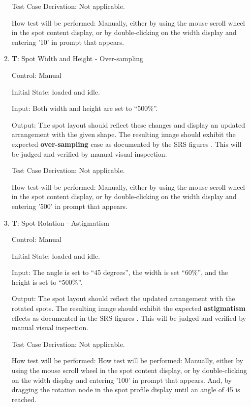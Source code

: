 \documentclass[12pt, titlepage]{article}
\newcounter{testnum} %
\begin{document}
\begin{enumerate}
    Test Case Derivation: Not applicable.
              
    How test will be performed: Manually, either by using the mouse scroll wheel in
      the spot content display, or by double-clicking on the width display and entering '10'
      in prompt that appears.

    \item{\textbf{T\thetestnum \label{T_spotSize500}}: Spot Width and Height - Over-sampling\\}

    Control: Manual
              
    Initial State: \progname{} loaded and idle.
              
    Input: Both width and height are set to ``500\%''.
              
    Output: The spot layout should reflect these changes and display an updated arrangement with the given shape.
      The resulting image should exhibit the expected \textbf{over-sampling} case as documented by the SRS figures \citep{SRS}.
      This will be judged and verified by manual visual inspection.

    Test Case Derivation: Not applicable.
              
    How test will be performed: Manually, either by using the mouse scroll wheel in
      the spot content display, or by double-clicking on the width display and entering '500'
      in prompt that appears.

  \item{\textbf{T\thetestnum \label{T_spotRotation}}: Spot Rotation - Astigmatism\\}

    Control: Manual
                
    Initial State: \progname{} loaded and idle.
              
    Input: The angle is set to ``45 degrees'', the width is set ``60\%'', and the height is set to ``500\%''.
              
    Output: The spot layout should reflect the updated arrangement with the rotated spots.
      The resulting image should exhibit the expected \textbf{astigmatism} effects as documented in the SRS figures \citep{SRS}.
      This will be judged and verified by manual visual inspection.

    Test Case Derivation: Not applicable.

    How test will be performed: How test will be performed: Manually, either by using the mouse scroll wheel in
    the spot content display, or by double-clicking on the width display and entering '100'
    in prompt that appears. And, by dragging the rotation node in the spot profile display
    until an angle of 45 is reached.


\end{enumerate}
\end{document}
